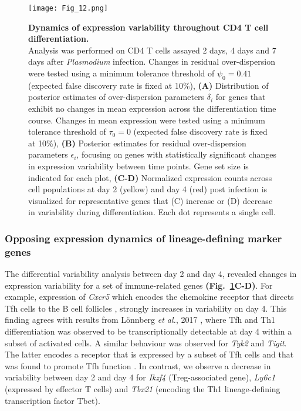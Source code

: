 \begin{figure}[!h]
\centering
\texttt{[image: Fig\_12.png]}
\caption[Dynamics of expression variability throughout CD4\plus{} T cell differentiation]{\textbf{Dynamics of expression variability throughout CD4\plus{} T cell differentiation.}\\
Analysis was performed on CD4\plus{} T cells assayed 2 days, 4 days and 7 days after \textit{Plasmodium} infection. Changes in residual over-dispersion were tested using a minimum tolerance threshold of $\psi_0=0.41$ (expected false discovery rate is fixed at 10\%), \textbf{(A)} Distribution of posterior estimates of over-dispersion parameters $\delta_i$ for genes that exhibit no changes in mean expression across the differentiation time course. Changes in mean expression were tested using a minimum tolerance threshold of $\tau_0=0$ (expected false discovery rate is fixed at 10\%), \textbf{(B)} Posterior estimates for residual over-dispersion parameters  $\epsilon_i$, focusing on genes with statistically significant changes in expression variability between time points. Gene set size is indicated for each plot, \textbf{(C-D)} Normalized expression counts across cell populations at day 2 (yellow) and day 4 (red) post infection is visualized for representative genes that (C) increase or (D) decrease in variability during differentiation. Each dot represents a single cell.\\}
\label{fig2:immune_differentiation}
\end{figure}

\newpage

\subsubsection{Opposing expression dynamics of lineage-defining marker genes}

The differential variability analysis between day 2 and day 4, revealed  changes in expression variability for a set of immune-related genes \textbf{(Fig.~\ref{fig2:immune_differentiation}C-D)}. For example, expression of \textit{Cxcr5} which encodes the chemokine receptor that directs Tfh cells to the B cell follicles \citep{Crotty2014}, strongly increases in variability on day 4. This finding agrees with results from L\"onnberg \emph{et al.}, 2017 \citep{Lonnberg2017}, where Tfh and Th1 differentiation was observed to be transcriptionally detectable at day 4 within a subset of activated cells. A similar behaviour was observed for \textit{Tyk2} and \textit{Tigit}. The latter encodes a receptor that is expressed by a subset of Tfh cells and that was found to promote Tfh function \citep{Godefroy2015}. In contrast, we observe a decrease in variability between day 2 and day 4 for \textit{Ikzf4} (Treg-associated gene), \textit{Ly6c1} (expressed by effector T cells) and \textit{Tbx21} (encoding the Th1 lineage-defining transcription factor Tbet). \\

